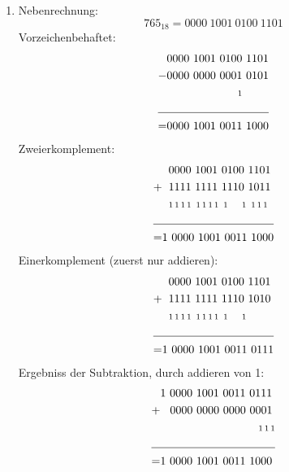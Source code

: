 \documentclass[DIN, pagenumber=false, fontsize=11pt, parskip=half]{scrartcl}
\begin{document}
    \begin{enumerate}
        \item Nebenrechnung: 
            \begin{equation*}
                {765}_{18} = 0000\ 1001\ 0100\ 1101
            \end{equation*}
            Vorzeichenbehaftet:
            \begin{align*}
                & \hspace{0.0cm} 0000\ 1001\ 0100\ 1101 \\
                - & \hspace{0.0cm}0000\ 0000\ 0001\ 0101\\
                & \hspace{2.2cm} {\scriptstyle 1} \\
                \cline{1-2}  
                = & 0000\ 1001\ 0011\ 1000
            \end{align*}
            Zweierkomplement:
            \begin{align*}
                & \hspace{0.2cm} 0000\ 1001\ 0100\ 1101 \\
                + & \hspace{0.2cm}1111\ 1111\ 1110\ 1011\\
                & \hspace{0.2cm} {\scriptstyle1\, 1\, 1\, 1\, \, \, 1\, 1\, 1\, 1\, \, \, 1\, \, \, \, \, \, \, \, \, 1\, \, \, 1\, 1\, 1} \\
                \cline{1-2}  
                = & 1\ 0000\ 1001\ 0011\ 1000
            \end{align*}
            Einerkomplement (zuerst nur addieren):
            \begin{align*}
                & \hspace{0.2cm} 0000\ 1001\ 0100\ 1101 \\
                + & \hspace{0.2cm}1111\ 1111\ 1110\ 1010\\
                & \hspace{0.2cm} {\scriptstyle1\, 1\, 1\, 1\, \, \, 1\, 1\, 1\, 1\, \, \, 1\, \, \, \, \, \, \, \, \, 1} \\
                \cline{1-2}  
                = & 1\ 0000\ 1001\ 0011\ 0111
            \end{align*}
            Ergebniss der Subtraktion, durch addieren von 1:
            \begin{align*}
                & 1\ 0000\ 1001\ 0011\ 0111\\
                + & \hspace{0.3cm}0000\ 0000\ 0000\ 0001\\
                & \hspace{3.03cm} {\scriptstyle1\, 1\, 1} \\
                \cline{1-2}  
                = & 1\ 0000\ 1001\ 0011\ 1000
            \end{align*}
    \end{enumerate}
\end{document}
